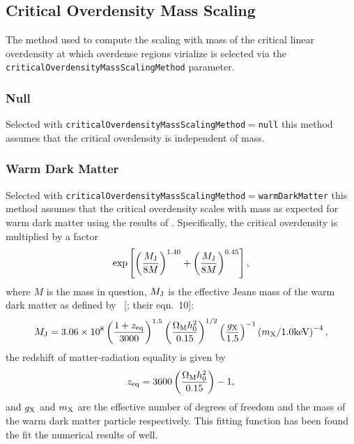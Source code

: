 \subsection{Critical Overdensity Mass Scaling}

The method used to compute the scaling with mass of the critical linear overdensity at which overdense regions virialize is selected via the {\tt criticalOverdensityMassScalingMethod} parameter.

\subsubsection{Null}

Selected with {\tt criticalOverdensityMassScalingMethod}$=${\tt null} this method assumes that the critical overdensity is independent of mass.

\subsubsection{Warm Dark Matter}

Selected with {\tt criticalOverdensityMassScalingMethod}$=${\tt warmDarkMatter} this method assumes that the critical overdensity scales with mass as expected for warm dark matter using the results of \cite{barkana_constraints_2001}. Specifically, the critical overdensity is multiplied by a factor
\begin{equation}
 \exp\left[ \left({M_{\rm J} \over 8 M}\right)^{1.40}+\left({M_{\rm J} \over 8 M}\right)^{0.45} \right],
\end{equation}
where $M$ is the mass in question, $M_{\rm J}$ is the effective Jeans mass of the warm dark matter as defined by \citeauthor{barkana_constraints_2001}~[\citeyear{barkana_constraints_2001}; their eqn.~10]:
\begin{equation}
M_{\rm J} =  3.06 \times 10^8 \left( {1+z_{\rm eq} \over 3000}\right)^{1.5} \left({\Omega_{\rm M} h_0^2 \over 0.15}\right)^{1/2} \left({g_{\rm X} \over 1.5} \right)^{-1} \left({m_{\rm X}/1.0\hbox{keV}}\right)^{-4},
\end{equation}
the redshift of matter-radiation equality is given by
\begin{equation}
z_{\rm eq} = 3600 \left({\Omega_{\rm M} h_0^2 \over 0.15}\right)-1,
\end{equation}
and $g_{\rm X}$ and $m_{\rm X}$ are the effective number of degrees of freedom and the mass of the warm dark matter particle respectively. This fitting function has been found the fit the numerical results of \cite{barkana_constraints_2001} well.

